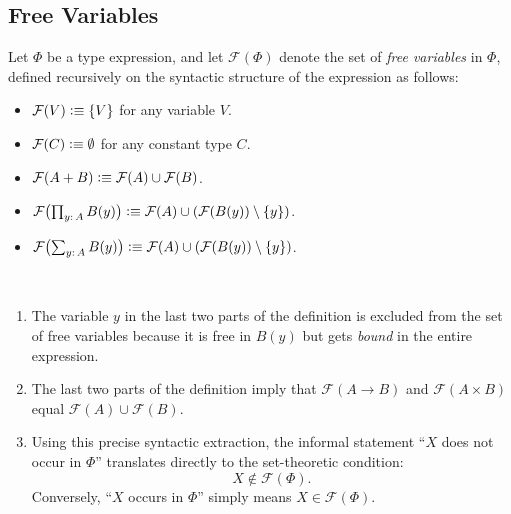 \subsection{Free Variables}

\begin{defn}
    Let $\Phi$ be a type expression, and let $\mathcal F(\Phi)$ denote the set of \textsl{free variables} in $\Phi$, defined recursively on the syntactic structure of the expression as follows:
    \begin{itemize}
        \item $\mathcal F(V)\mathrel{\vcentcolon}\equiv\{V\}$ for any variable $V$.

        \item $\mathcal F(C)\mathrel{\vcentcolon}\equiv\emptyset$ for any constant type $C$.
        
        \item $\mathcal F(A+B)\mathrel{\vcentcolon}\equiv\mathcal F(A)\cup\mathcal F(B)$.

        \item $\mathcal F\bigl(\prod_{y\colon A}B(y)\bigr)\defeq\mathcal F(A)\cup(\mathcal F(B(y))\setminus\set y)$.
        
        \item $\mathcal F\bigl(\sum_{y\colon A}B(y)\bigr)\defeq\mathcal F(A)\cup(\mathcal F(B(y))\setminus\set y)$.
    \end{itemize}
\end{defn}

\begin{rems}\ 
    \begin{enumerate}[-]
        \item The variable $y$ in the last two parts of the definition is excluded from the set of free variables because it is free in $B(y)$ but gets \textsl{bound} in the entire expression.

        \item The last two parts of the definition imply that $\mathcal F(A\to B)$ and $\mathcal F(A\times B)$ equal $\mathcal F(A)\cup\mathcal F(B)$.
    
        \item Using this precise syntactic extraction, the informal statement ``$X$ does not occur in $\Phi$'' translates directly to the set-theoretic condition:
        \[
            X\notin\mathcal F(\Phi).
        \]
        Conversely, ``$X$ occurs in $\Phi$'' simply means $X\in\mathcal F(\Phi)$.
    \end{enumerate}
    
\end{rems}

